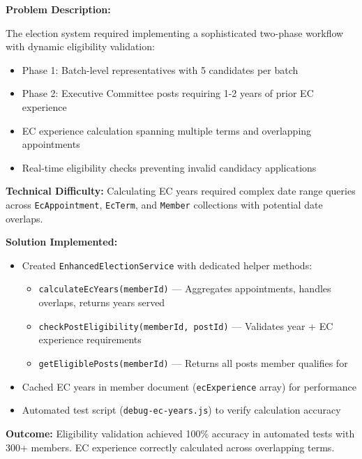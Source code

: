\documentclass[12pt,a4paper]{article}
\begin{document}
\begin{tcolorbox}[colback=LightTeal, colframe=Teal, title=\textbf{Challenge 1: Complex Two-Phase Election System}, fonttitle=\bfseries]

\textbf{Problem Description:}

The election system required implementing a sophisticated two-phase workflow with dynamic eligibility validation:
\begin{itemize}[noitemsep]
  \item Phase 1: Batch-level representatives with 5 candidates per batch
  \item Phase 2: Executive Committee posts requiring 1-2 years of prior EC experience
  \item EC experience calculation spanning multiple terms and overlapping appointments
  \item Real-time eligibility checks preventing invalid candidacy applications
\end{itemize}

\textbf{Technical Difficulty:} Calculating EC years required complex date range queries across \texttt{EcAppointment}, \texttt{EcTerm}, and \texttt{Member} collections with potential date overlaps.

\textbf{Solution Implemented:}
\begin{itemize}[noitemsep]
  \item Created \texttt{EnhancedElectionService} with dedicated helper methods:
    \begin{itemize}[noitemsep]
      \item \texttt{calculateEcYears(memberId)} — Aggregates appointments, handles overlaps, returns years served
      \item \texttt{checkPostEligibility(memberId, postId)} — Validates year + EC experience requirements
      \item \texttt{getEligiblePosts(memberId)} — Returns all posts member qualifies for
    \end{itemize}
  \item Cached EC years in member document (\texttt{ecExperience} array) for performance
  \item Automated test script (\texttt{debug-ec-years.js}) to verify calculation accuracy
\end{itemize}

\textbf{Outcome:} Eligibility validation achieved 100\% accuracy in automated tests with 300+ members. EC experience correctly calculated across overlapping terms.
\end{tcolorbox}
\end{document}
